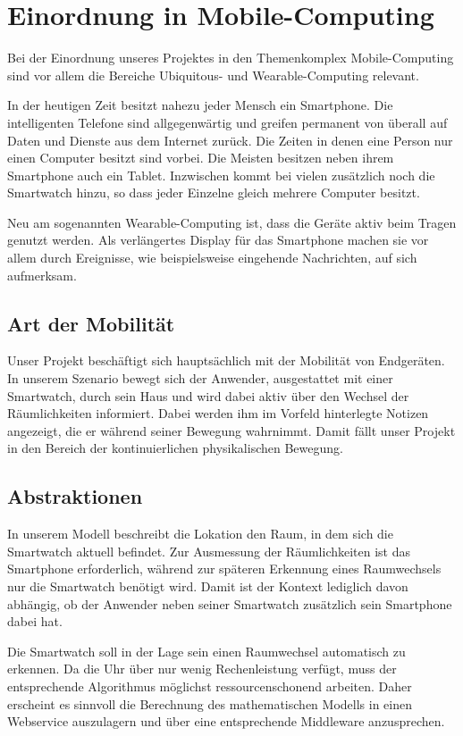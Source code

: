 \section{Einordnung in Mobile-Computing}
Bei der Einordnung unseres Projektes in den Themenkomplex Mobile-Computing sind vor allem die Bereiche Ubiquitous- und Wearable-Computing relevant. 

In der heutigen Zeit besitzt nahezu jeder Mensch ein Smartphone. Die intelligenten Telefone sind allgegenwärtig und greifen permanent von überall auf Daten und Dienste aus dem Internet zurück. Die Zeiten in denen eine Person nur einen Computer besitzt sind vorbei. Die Meisten besitzen neben ihrem Smartphone auch ein Tablet. Inzwischen kommt bei vielen zusätzlich noch die Smartwatch hinzu, so dass jeder Einzelne gleich mehrere Computer besitzt.

Neu am sogenannten Wearable-Computing ist, dass die Geräte aktiv beim Tragen genutzt werden. Als verlängertes Display für das Smartphone machen sie vor allem durch Ereignisse, wie beispielsweise eingehende Nachrichten, auf sich aufmerksam. 

\subsection{Art der Mobilität}
Unser Projekt beschäftigt sich hauptsächlich mit der Mobilität von Endgeräten. In unserem Szenario bewegt sich der Anwender, ausgestattet mit einer Smartwatch, durch sein Haus und wird dabei aktiv über den Wechsel der Räumlichkeiten informiert. Dabei werden ihm im Vorfeld hinterlegte Notizen angezeigt, die er während seiner Bewegung wahrnimmt. Damit fällt unser Projekt in den Bereich der kontinuierlichen physikalischen Bewegung.

\subsection{Abstraktionen}
In unserem Modell beschreibt die Lokation den Raum, in dem sich die Smartwatch aktuell befindet. Zur Ausmessung der Räumlichkeiten ist das Smartphone erforderlich, während zur späteren Erkennung eines Raumwechsels nur die Smartwatch benötigt wird. Damit ist der Kontext lediglich davon abhängig, ob der Anwender neben seiner Smartwatch zusätzlich sein Smartphone dabei hat.

Die Smartwatch soll in der Lage sein einen Raumwechsel automatisch zu erkennen. Da die Uhr über nur wenig Rechenleistung verfügt, muss der entsprechende Algorithmus möglichst ressourcenschonend arbeiten. Daher erscheint es sinnvoll die Berechnung des mathematischen Modells in einen Webservice auszulagern und über eine entsprechende Middleware anzusprechen.

